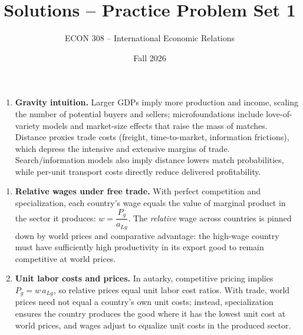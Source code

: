 \documentclass[11pt]{article}
\title{Solutions -- Practice Problem Set 1}
\author{ECON 308 -- International Economic Relations}
\date{Fall 2026}
\begin{document}
\maketitle



\begin{enumerate}[leftmargin=*]
\item \textbf{Gravity intuition.} Larger GDPs imply more production and income, scaling the number of potential buyers and sellers; microfoundations include love-of-variety models and market-size effects that raise the mass of matches. Distance proxies trade costs (freight, time-to-market, information frictions), which depress the intensive and extensive margins of trade. Search/information models also imply distance lowers match probabilities, while per-unit transport costs directly reduce delivered profitability.





\end{enumerate}




\begin{enumerate}[leftmargin=*,resume]

\item \textbf{Relative wages under free trade.} With perfect competition and specialization, each country's wage equals the value of marginal product in the sector it produces: $w=\dfrac{P_g}{a_{Lg}}$. The \emph{relative} wage across countries is pinned down by world prices and comparative advantage: the high-wage country must have sufficiently high productivity in its export good to remain competitive at world prices.


\item \textbf{Unit labor costs and prices.} In autarky, competitive pricing implies $P_g=w\,a_{Lg}$, so relative prices equal unit labor cost ratios. With trade, world prices need not equal a country's own unit costs; instead, specialization ensures the country produces the good where it has the lowest unit cost at world prices, and wages adjust to equalize unit costs in the produced sector.
\end{enumerate}
\end{document}
